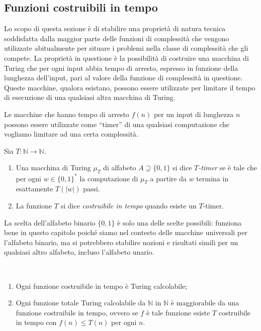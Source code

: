 \subsection{Funzioni costruibili in tempo}

Lo scopo di questa sezione è di stabilire una proprietà di natura tecnica soddisfatta dalla maggior parte delle funzioni di complessità che vengono utilizzate abitualmente per situare i problemi nella classe di complessità che gli compete. La proprietà in questione è la possibilità di costruire una macchina di Turing che per ogni input abbia tempo di arresto, espresso in funzione della lunghezza dell'input, pari al valore della funzione di complessità in questione. Queste macchine, qualora esistano, possono essere utilizzate per limitare il tempo di esecuzione di una qualsiasi altra macchina di Turing.

Le macchine che hanno tempo di arresto $f(n)$ per un input di lunghezza $n$ possono essere utilizzate come ``timer'' di una qualsiasi computazione che vogliamo limitare ad una certa complessità.

\begin{defi}
Sia $T\colon\mathbb N\to\mathbb N$.
\begin{enumerate}
\item Una macchina di Turing $\mu_T$ di alfabeto $A\supseteq\{0,1\}$ si dice \emph{$T$-timer} se è tale che per ogni $w\in\{0,1\}^*$ la computazione di $\mu_T$ a partire da $w$ termina in esattamente $T(|w|)$ passi.
\item La funzione $T$ si dice \emph{costruibile in tempo} quando esiste un $T$-timer.
\end{enumerate}
\end{defi}

La scelta dell'alfabeto binario $\{0,1\}$ è solo una delle scelte possibili: funziona bene in questo capitolo poiché siamo nel contesto delle macchine universali per l'alfabeto binario, ma si potrebbero stabilire nozioni e risultati simili per un qualsiasi altro alfabeto, incluso l'alfabeto unario.

\begin{prop}\
\begin{enumerate}
\item Ogni funzione costruibile in tempo è Turing calcolabile;
\item Ogni funzione totale Turing calcolabile da $\mathbb N$ in $\mathbb N$ è maggiorabile da una funzione costruibile in tempo, ovvero se $f$ è tale funzione esiste $T$ costruibile in tempo con $f(n)\le T(n)$ per ogni $n$.
\end{enumerate}
\end{prop}

